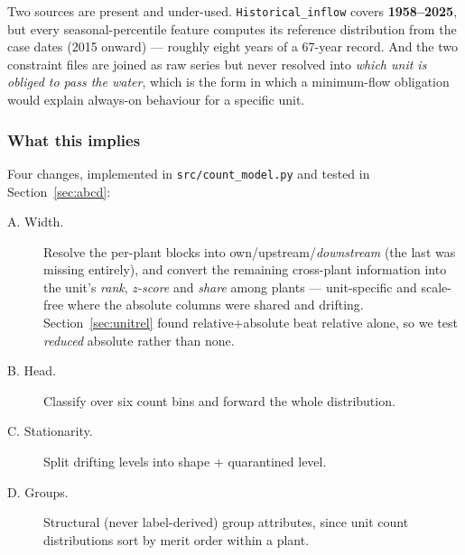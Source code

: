 Two sources are present and under-used. \texttt{Historical\_inflow} covers \textbf{1958--2025},
but every seasonal-percentile feature computes its reference distribution from the case dates
(2015 onward) --- roughly eight years of a 67-year record. And the two constraint files are
joined as raw series but never resolved into \emph{which unit is obliged to pass the water},
which is the form in which a minimum-flow obligation would explain always-on behaviour for a
specific unit.

\subsubsection*{What this implies}

Four changes, implemented in \texttt{src/count\_model.py} and tested in
Section~\ref{sec:abcd}:

\begin{description}
  \item[A. Width.] Resolve the per-plant blocks into own/upstream/\emph{downstream} (the last
    was missing entirely), and convert the remaining cross-plant information into the unit's
    \emph{rank}, \emph{z-score} and \emph{share} among plants --- unit-specific and scale-free
    where the absolute columns were shared and drifting. Section~\ref{sec:unitrel} found
    relative$+$absolute beat relative alone, so we test \emph{reduced} absolute rather than
    none.
  \item[B. Head.] Classify over six count bins and forward the whole distribution.
  \item[C. Stationarity.] Split drifting levels into shape $+$ quarantined level.
  \item[D. Groups.] Structural (never label-derived) group attributes, since unit count
    distributions sort by merit order within a plant.
\end{description}
